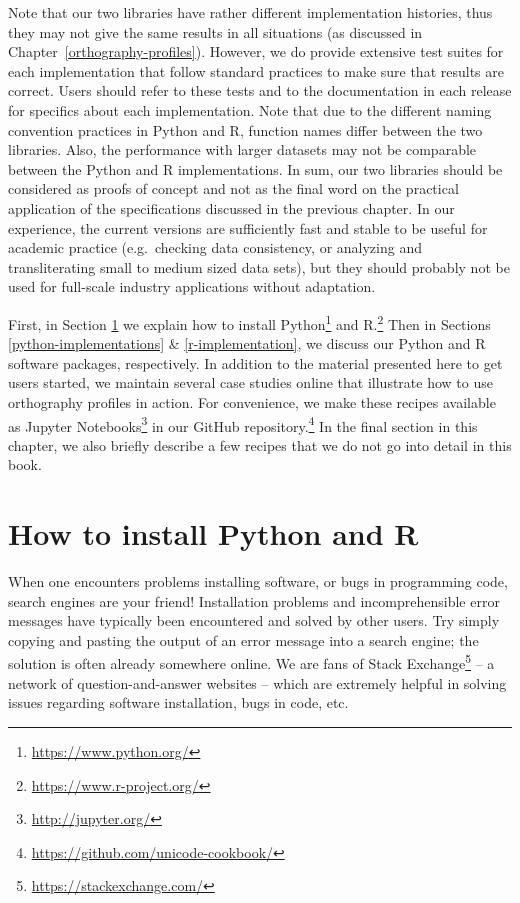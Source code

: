 \documentclass[output=book,nonflat,modfonts,
citecolor=brown,
		]{langsci/langscibook}\usepackage[]{graphicx}\usepackage[]{color}
\begin{document}
Note that our two libraries have rather different implementation histories, thus they may not give the same results in all situations (as discussed in Chapter~\ref{orthography-profiles}). However, we do provide extensive test suites for each implementation that follow standard practices to make sure that results are correct. Users should refer to these tests and to the documentation in each release for specifics about each implementation. Note that due to the different naming convention practices in Python and R, function names differ between the two libraries. Also, the performance with larger datasets may not be comparable between the Python and R implementations. In sum, our two libraries should be considered as proofs of concept and not as the final word on the practical application of the specifications discussed in the previous chapter. In our experience, the current versions are sufficiently fast and stable to be useful for academic practice (e.g.\ checking data consistency, or analyzing and transliterating small to medium sized data sets), but they should probably not be used for full-scale industry applications without adaptation.

First, in Section \ref{installing-python-and-r} we explain how to install Python\footnote{\url{https://www.python.org/}} and R.\footnote{\url{https://www.r-project.org/}} Then in Sections \ref{python-implementations} \& \ref{r-implementation}, we discuss our Python and R software packages, respectively. In addition to the material presented here to get users started, we maintain several case studies online that illustrate how to use orthography profiles in action. For convenience, we make these recipes available as Jupyter Notebooks\footnote{\url{http://jupyter.org/}} in our GitHub repository.\footnote{\url{https://github.com/unicode-cookbook/}} In the final section in this chapter, we also briefly describe a few recipes that we do not go into detail in this book.

\section{How to install Python and R}
\label{installing-python-and-r}
When one encounters problems installing software, or bugs in programming code, search engines are your friend! Installation problems and incomprehensible error messages have typically been encountered and solved by other users. Try simply copying and pasting the output of an error message into a search engine; the solution is often already somewhere online. We are fans of Stack Exchange\footnote{\url{https://stackexchange.com/}} -- a network of question-and-answer websites -- which are extremely helpful in solving issues regarding software installation, bugs in code, etc.
\end{document}
